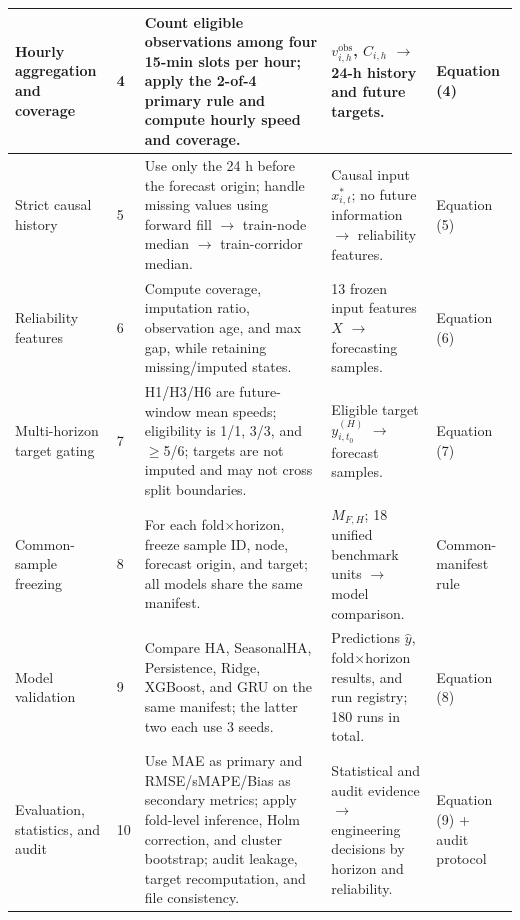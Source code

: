 \documentclass[pdflatex,sn-mathphys-num,iicol]{sn-jnl}
\begin{document}
\begin{table}[!t]
\begin{tabular}{
|p{}
|p{}
|p{}
|p{}
|p{}|
}
Hourly aggregation and coverage
&
4
&
Count eligible observations among four 15-min slots per hour; apply the 2-of-4 primary rule and compute hourly speed and coverage.
&
$v^{\mathrm{obs}}_{i,h}$, $C_{i,h}$ $\rightarrow$ 24-h history and future targets.
&
Equation (4)
\\
\hline

Strict causal history
&
5
&
Use only the 24 h before the forecast origin; handle missing values using forward fill $\rightarrow$ train-node median $\rightarrow$ train-corridor median.
&
Causal input $x^{*}_{i,t}$; no future information $\rightarrow$ reliability features.
&
Equation (5)
\\
\hline

Reliability features
&
6
&
Compute coverage, imputation ratio, observation age, and max gap, while retaining missing/imputed states.
&
13 frozen input features $X$ $\rightarrow$ forecasting samples.
&
Equation (6)
\\
\hline

Multi-horizon target gating
&
7
&
H1/H3/H6 are future-window mean speeds; eligibility is 1/1, 3/3, and $\geq$5/6; targets are not imputed and may not cross split boundaries.
&
Eligible target $y^{(H)}_{i,t_0}$ $\rightarrow$ forecast samples.
&
Equation (7)
\\
\hline

Common-sample freezing
&
8
&
For each fold$\times$horizon, freeze sample ID, node, forecast origin, and target; all models share the same manifest.
&
$M_{F,H}$; 18 unified benchmark units $\rightarrow$ model comparison.
&
Common-manifest rule
\\
\hline

Model validation
&
9
&
Compare HA, SeasonalHA, Persistence, Ridge, XGBoost, and GRU on the same manifest; the latter two each use 3 seeds.
&
Predictions $\hat{y}$, fold$\times$horizon results, and run registry; 180 runs in total.
&
Equation (8)
\\
\hline

Evaluation, statistics, and audit
&
10
&
Use MAE as primary and RMSE/sMAPE/Bias as secondary metrics; apply fold-level inference, Holm correction, and cluster bootstrap; audit leakage, target recomputation, and file consistency.
&
Statistical and audit evidence $\rightarrow$ engineering decisions by horizon and reliability.
&
Equation (9) + audit protocol
\\
\hline

\end{tabular}


\end{table}
\end{document}
